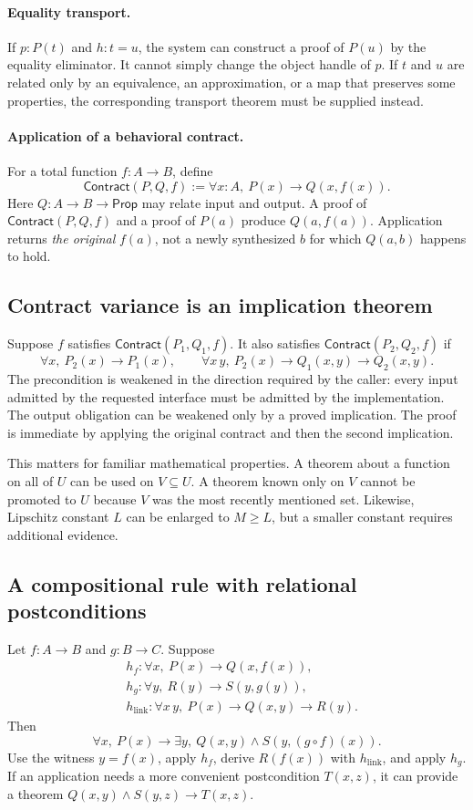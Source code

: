 \documentclass[11pt,letterpaper]{article}
\newcommand{\Prop}{\mathsf{Prop}}
\newcommand{\Contract}{\mathsf{Contract}}
\theoremstyle{definition}
\theoremstyle{remark}
\begin{document}
\paragraph{Equality transport.}
If $p:P(t)$ and $h:t=u$, the system can construct a proof of $P(u)$ by the equality
eliminator. It cannot simply change the object handle of $p$. If $t$ and $u$ are
related only by an equivalence, an approximation, or a map that preserves some
properties, the corresponding transport theorem must be supplied instead.

\paragraph{Application of a behavioral contract.}
For a total function $f:A\to B$, define
\[
\Contract(P,Q,f):=\forall x:A,\ P(x)\to Q(x,f(x)).
\tag{1}
\]
Here $Q:A\to B\to\Prop$ may relate input and output. A proof of
$\Contract(P,Q,f)$ and a proof of $P(a)$ produce $Q(a,f(a))$. Application returns
\emph{the original} $f(a)$, not a newly synthesized $b$ for which $Q(a,b)$ happens
to hold.

\subsection{Contract variance is an implication theorem}
Suppose $f$ satisfies $\Contract(P_1,Q_1,f)$. It also satisfies
$\Contract(P_2,Q_2,f)$ if
\[
\forall x,\ P_2(x)\to P_1(x),\qquad
\forall x\,y,\ P_2(x)\to Q_1(x,y)\to Q_2(x,y).
\tag{2}
\]
The precondition is weakened in the direction required by the caller: every
input admitted by the requested interface must be admitted by the implementation.
The output obligation can be weakened only by a proved implication. The proof is
immediate by applying the original contract and then the second implication.

This matters for familiar mathematical properties. A theorem about a function on
all of $U$ can be used on $V\subseteq U$. A theorem known only on $V$ cannot be
promoted to $U$ because $V$ was the most recently mentioned set. Likewise,
Lipschitz constant $L$ can be enlarged to $M\ge L$, but a smaller constant requires
additional evidence.

\subsection{A compositional rule with relational postconditions}
Let $f:A\to B$ and $g:B\to C$. Suppose
\[
\begin{aligned}
&h_f:\forall x,\ P(x)\to Q(x,f(x)),\\
&h_g:\forall y,\ R(y)\to S(y,g(y)),\\
&h_{\mathrm{link}}:\forall x\,y,\ P(x)\to Q(x,y)\to R(y).
\end{aligned}
\]
Then
\[
\forall x,\ P(x)\to
\exists y,\ Q(x,y)\land S(y,(g\circ f)(x)).
\tag{3}
\]
Use the witness $y=f(x)$, apply $h_f$, derive $R(f(x))$ with
$h_{\mathrm{link}}$, and apply $h_g$. If an application needs a more convenient
postcondition $T(x,z)$, it can provide a theorem
$Q(x,y)\land S(y,z)\to T(x,z)$.
\end{document}
